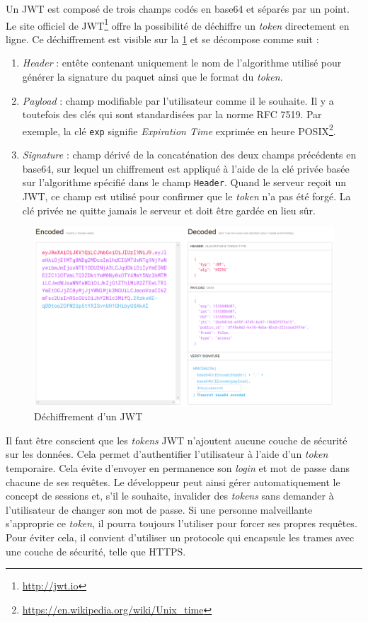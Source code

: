 Un JWT est composé de trois champs codés en base64 et séparés par un point. Le site officiel de JWT\footnote{\url{http://jwt.io}} offre la possibilité de déchiffre un \textit{token} directement en ligne. Ce déchiffrement est visible sur la \cref{fig-jwt_token_decrypt} et se décompose comme suit : 
\begin{enumerate}
    \item \textit{Header} : entête contenant uniquement le nom de l'algorithme utilisé pour générer la signature du paquet ainsi que le format du \textit{token}. 
    \item \textit{Payload} : champ modifiable par l'utilisateur comme il le souhaite. Il y a toutefois des clés qui sont standardisées par la norme RFC 7519. Par exemple, la clé \texttt{exp} signifie \textit{Expiration Time} exprimée en heure POSIX\footnote{\url{https://en.wikipedia.org/wiki/Unix_time}}.
    \item \textit{Signature} : champ dérivé de la concaténation des deux champs précédents en base64, sur lequel un chiffrement est appliqué à l'aide de la clé privée basée sur l'algorithme spécifié dans le champ \texttt{Header}. Quand le serveur reçoit un JWT, ce champ est utilisé pour confirmer que le \textit{token} n'a pas été forgé. La clé privée ne quitte jamais le serveur et doit être gardée en lieu sûr.
\end{enumerate}

\begin{figure}[ht!]
    \centering
    \includegraphics[width=1.0\textwidth]{Figures/Security/jwt_token_decrypt.png}
    \caption{Déchiffrement d'un JWT}
    \label{fig-jwt_token_decrypt}
\end{figure}

Il faut être conscient que les \textit{tokens} JWT n'ajoutent aucune couche de sécurité sur les données. Cela permet d'authentifier l'utilisateur à l'aide d'un \textit{token} temporaire. Cela évite d'envoyer en permanence son \textit{login} et mot de passe dans chacune de ses requêtes. Le développeur peut ainsi gérer automatiquement le concept de sessions et, s’il le souhaite, invalider des \textit{tokens} sans demander à l'utilisateur de changer son mot de passe. Si une personne malveillante s'approprie ce \textit{token}, il pourra toujours l'utiliser pour forcer ses propres requêtes. Pour éviter cela, il convient d'utiliser un protocole qui encapsule les trames avec une couche de sécurité, telle que HTTPS.



